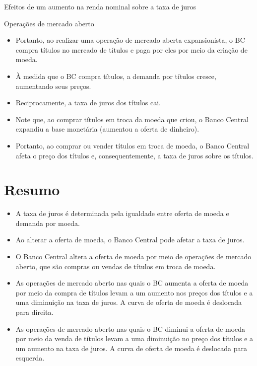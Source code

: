 \documentclass[10pt]{beamer}
\begin{document}
\begin{frame}{Efeitos de um aumento na renda nominal sobre a taxa de juros}
\begin{frame}{Operações de mercado aberto}
    \begin{itemize}
        \item Portanto, ao realizar uma operação de mercado aberta expansionista, o BC compra títulos no mercado de títulos e paga por eles por meio da criação de moeda.
        \bigskip
        \item À medida que o BC compra títulos, a demanda por títulos cresce, aumentando seus preços.
        \bigskip
        \item Reciprocamente, a taxa de juros dos títulos cai.
        \bigskip
        \item Note que, ao comprar títulos em troca da moeda que criou, o Banco Central expandiu a base monetária (aumentou a oferta de dinheiro).
        \bigskip
        \item Portanto, ao comprar ou vender títulos em troca de moeda, o Banco Central afeta o preço dos títulos e, consequentemente, a taxa de juros sobre os títulos.
    \end{itemize}
\end{frame}

\section{Resumo}
\begin{frame}
    \begin{itemize}
        \item A taxa de juros é determinada pela igualdade entre oferta de moeda e demanda por moeda.
        \bigskip
        \item Ao alterar a oferta de moeda, o Banco Central pode afetar a taxa de juros.
        \bigskip
        \item O Banco Central altera a oferta de moeda por meio de operações de mercado aberto, que são compras ou vendas de títulos em troca de moeda.
        \bigskip
        \item As operações de mercado aberto nas quais o BC aumenta a oferta de moeda por meio da compra de títulos levam a um aumento nos preços dos títulos e a uma diminuição na taxa de juros. A curva de oferta de moeda é deslocada para direita.
        \bigskip
        \item As operações de mercado aberto nas quais o BC diminui a oferta de moeda por meio da venda de títulos levam a uma diminuição no preço dos títulos e a um aumento na taxa de juros. A curva de oferta de moeda é deslocada para esquerda.
    \end{itemize}
\end{frame}


\end{frame}
\end{document}

